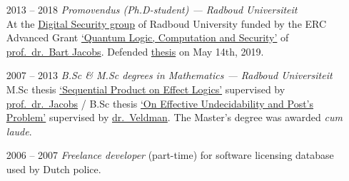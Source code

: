 \documentclass[a4page]{article}
\newcommand\hsep{ {\color{gray}/} }
\begin{document}
\begin{itemize}
            
    \item[2013 -- 2018]  \emph{Promovendus (Ph.D-student) ---
        Radboud Universiteit}\\
        At the \href{http://www.ru.nl/ds/}{Digital Security group}
        of Radboud University funded by
        the ERC Advanced Grant \href{https://cordis.europa.eu/project/rcn/107285_en.html}{`Quantum Logic, Computation and Security'}
        of \href{http://www.cs.ru.nl/B.Jacobs/}{prof.~dr.~Bart Jacobs}.
            Defended
            \href{http://westerbaan.name/~bas/thesis.pdf}{thesis}
            on May 14th, 2019.
    \item[2007 -- 2013] \emph{B.Sc \& M.Sc degrees in Mathematics ---
                Radboud Universiteit} \\
        M.Sc thesis \href{www.ru.nl/publish/pages/813276/masterscriptie_bas_westerbaan.pdf}{`Sequential Product on Effect Logics'}
            supervised by \href{http://www.cs.ru.nl/B.Jacobs/}{prof.~dr.~Jacobs} \hsep
        B.Sc thesis \href{https://arxiv.org/abs/1409.1030}{`On Effective Undecidability and Post's Problem'}
            supervised by \href{http://www.ru.nl/wiskunde/@1039532/veldman-dhr-dr-(wim)/}{dr.~Veldman}.
        The Master's degree was awarded \emph{cum laude}.
    \item[2006 -- 2007] \emph{Freelance developer} (part-time)
        for software licensing database used by Dutch police.
\end{itemize}
\end{document}
